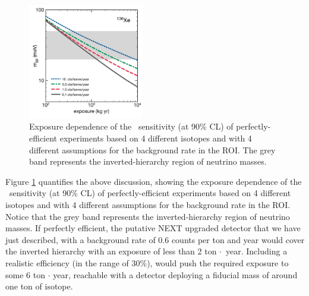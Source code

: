 \begin{figure}
\includegraphics[width=0.45\textwidth]{img/FutureXe136.pdf}
\caption{Exposure dependence of the \mbb\ sensitivity (at 90\% CL) of perfectly-efficient experiments based on 4 different isotopes and with 4 different assumptions for the background rate in the ROI. The grey band represents the inverted-hierarchy region of neutrino masses.} \label{fig:FutureGen}
\end{figure}

Figure \ref{fig:FutureGen} quantifies the above discussion, showing the exposure dependence of the \mbb\ sensitivity (at 90\% CL) of perfectly-efficient experiments based on 4 different isotopes and with 4 different assumptions for the background rate in the ROI. Notice that the grey band represents the inverted-hierarchy region of neutrino masses. If perfectly efficient, the putative NEXT upgraded detector that we have just described, with a background rate of 0.6 counts per ton and year would cover the inverted hierarchy with an exposure of less than 2 ton $\cdot$~year. Including a realistic efficiency (in the range of 30\%), would push the required exposure to some 6 ton $\cdot$ year, reachable with a detector deploying a fiducial mass of around one ton of isotope.  

